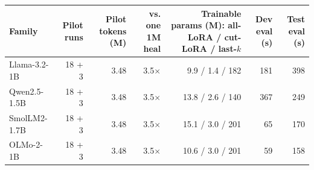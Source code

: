 \begin{tabular}{lrrrrrr}
\toprule
Family & Pilot runs & Pilot tokens (M) & vs. one 1M heal & Trainable params (M): all-LoRA / cut-LoRA / last-$k$ & Dev eval (s) & Test eval (s) \\
\midrule
Llama-3.2-1B & 18 + 3 & 3.48 & 3.5$\times$ & 9.9 / 1.4 / 182 & 181 & 398 \\
Qwen2.5-1.5B & 18 + 3 & 3.48 & 3.5$\times$ & 13.8 / 2.6 / 140 & 367 & 249 \\
SmolLM2-1.7B & 18 + 3 & 3.48 & 3.5$\times$ & 15.1 / 3.0 / 201 & 65 & 170 \\
OLMo-2-1B & 18 + 3 & 3.48 & 3.5$\times$ & 10.6 / 3.0 / 201 & 59 & 158 \\
\bottomrule
\end{tabular}
